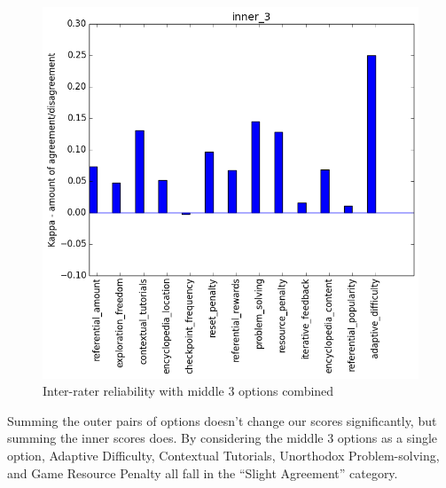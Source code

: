 				\begin{figure}[] 
					\centering 
					\includegraphics[width=\textwidth, height=.4\textheight, keepaspectratio=true]{inner_3_stats.png} 
					\caption{Inter-rater reliability with middle 3 options combined}
				\end{figure}

				Summing the outer pairs of options doesn't change our scores significantly, but summing the inner scores does. By considering the middle 3 options as a single option, Adaptive Difficulty, Contextual Tutorials, Unorthodox Problem-solving, and Game Resource Penalty all fall in the ``Slight Agreement'' category.
				
			













